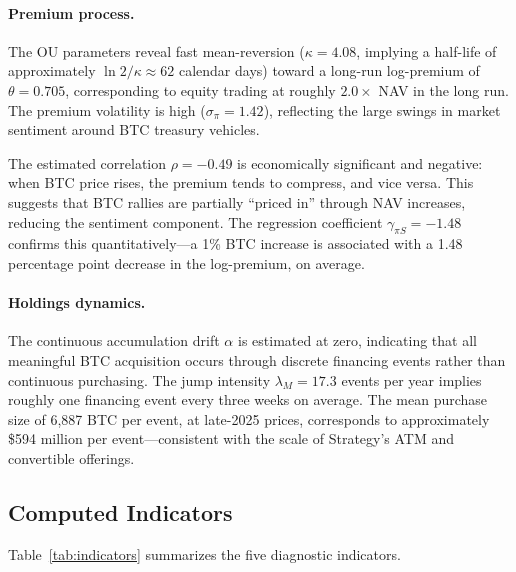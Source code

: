 \paragraph{Premium process.} The OU parameters reveal fast mean-reversion ($\kappa = 4.08$, implying a half-life of approximately $\ln 2 / \kappa \approx 62$ calendar days) toward a long-run log-premium of $\theta = 0.705$, corresponding to equity trading at roughly $2.0\times$ NAV in the long run. The premium volatility is high ($\sigma_\pi = 1.42$), reflecting the large swings in market sentiment around BTC treasury vehicles.

The estimated correlation $\rho = -0.49$ is economically significant and negative: when BTC price rises, the premium tends to compress, and vice versa. This suggests that BTC rallies are partially ``priced in'' through NAV increases, reducing the sentiment component. The regression coefficient $\gamma_{\pi S} = -1.48$ confirms this quantitatively---a 1\% BTC increase is associated with a 1.48 percentage point decrease in the log-premium, on average.

\paragraph{Holdings dynamics.} The continuous accumulation drift $\alpha$ is estimated at zero, indicating that all meaningful BTC acquisition occurs through discrete financing events rather than continuous purchasing. The jump intensity $\lambda_M = 17.3$ events per year implies roughly one financing event every three weeks on average. The mean purchase size of 6{,}887 BTC per event, at late-2025 prices, corresponds to approximately \$594 million per event---consistent with the scale of Strategy's ATM and convertible offerings.

\subsection{Computed Indicators}

Table~\ref{tab:indicators} summarizes the five diagnostic indicators.

